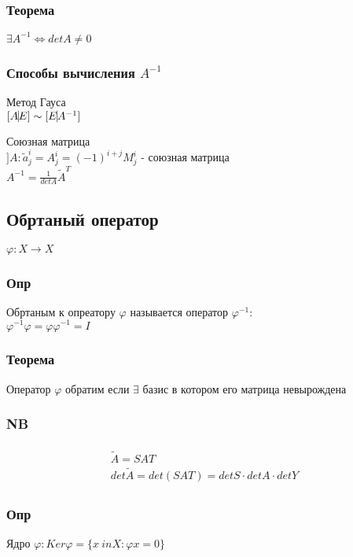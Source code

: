 \documentclass{article}
\begin{document}
\subsubsection{Теорема}
$\exists A^{-1} \Leftrightarrow det A \not = 0$

\subsubsection{Способы вычисления $A^{-1}$}
\begin{description}
\item Метод Гауса \\
  $[A \vline E] \sim [E \vline A^{-1}]$
\item Союзная матрица \\
  $] A : \tilde{a}^i_j = A^i_j = (-1)^{i+j}M^i_j$ - союзная матрица \\
  $A^{-1} = \frac{1}{det A}\tilde{A}^T$
\end{description}

\subsection{Обртаный оператор}
$\varphi : X \rightarrow X$
\subsubsection{Опр}
Обртаным к опреатору $\varphi$ называется оператор $\varphi^{-1}$: \\
$\varphi^{-1}\varphi = \varphi \varphi^{-1} = I$

\subsubsection{Теорема}
Оператор $\varphi$ обратим если $\exists$ базис в котором его матрица невырождена

\subsubsection{NB}
\begin{multline*}
\begin{aligned}
\tilde{A} = SAT \\
det \tilde{A} = det(SAT) = detS \cdot detA \cdot detY
\end{aligned}
\end{multline*}

\subsubsection{Опр}
Ядро $\varphi : Ker \varphi = \{x \ in X: \varphi x = 0\}$ 
\end{document}

